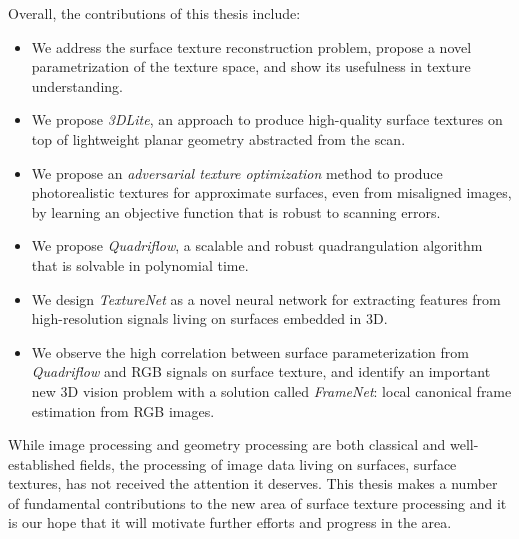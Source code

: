 Overall, the contributions of this thesis include:
\begin{itemize}
    \item We address the surface texture reconstruction problem, propose a novel parametrization of the texture space, and show its usefulness in texture understanding.
    \item We propose \emph{3DLite}, an approach to produce high-quality surface textures on top of lightweight planar geometry abstracted from the scan.
    \item We propose an \emph{adversarial texture optimization} method to produce photorealistic textures for approximate surfaces, even from misaligned images, by learning an objective function that is robust to scanning errors.
    \item We propose \emph{Quadriflow}, a scalable and robust quadrangulation algorithm that is solvable in polynomial time.
    \item We design \emph{TextureNet} as a novel neural network for extracting features from high-resolution signals living on surfaces embedded in 3D. 
    \item We observe the high correlation between surface parameterization from \emph{Quadriflow} and RGB signals on surface texture, and identify an important new 3D vision problem with a solution called \emph{FrameNet}: local canonical frame estimation from RGB images.
\end{itemize}

While image processing and geometry processing are both classical and well-established fields, the processing of image data living on surfaces, surface textures, has not received the attention it deserves. This thesis makes a number of fundamental contributions to the new area of surface texture processing and it is our hope that it will motivate further efforts and progress in the area. 

